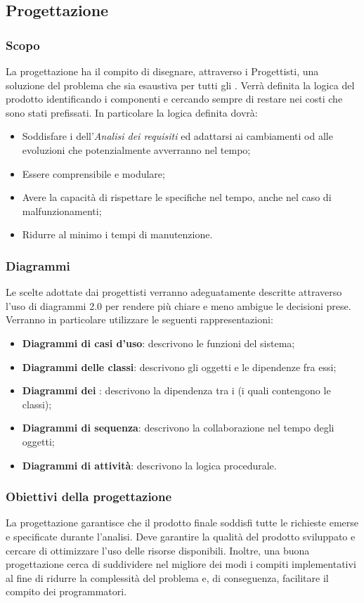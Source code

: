 \subsection{Progettazione}
\subsubsection{Scopo}
La progettazione ha il compito di disegnare, attraverso i Progettisti, una soluzione del problema che sia esaustiva per tutti gli . Verrà definita la logica del prodotto identificando i componenti e cercando sempre di restare nei costi che sono stati prefissati. In particolare la logica definita dovrà:
\begin{itemize}
	\item Soddisfare i  dell’\emph{Analisi dei requisiti} ed adattarsi ai cambiamenti od alle evoluzioni che potenzialmente avverranno nel tempo;
	\item Essere comprensibile e modulare;
	\item Avere la capacità di rispettare le specifiche nel tempo, anche nel caso di malfunzionamenti;
	\item Ridurre al minimo i tempi di manutenzione.
\end{itemize}
\subsubsection{Diagrammi}
Le scelte adottate dai progettisti verranno adeguatamente descritte attraverso l’uso di diagrammi  2.0 per rendere più chiare e meno ambigue le decisioni prese. Verranno in particolare utilizzare le seguenti rappresentazioni:
\begin{itemize}
	\item \textbf{Diagrammi di casi d’uso}: descrivono le funzioni del sistema;
	\item \textbf{Diagrammi delle classi}: descrivono gli oggetti e le dipendenze fra essi;
	\item \textbf{Diagrammi dei }: descrivono la dipendenza tra i  (i quali contengono le classi);
	\item \textbf{Diagrammi di sequenza}: descrivono la collaborazione nel tempo degli oggetti;
	\item \textbf{Diagrammi di attività}: descrivono la logica procedurale.
\end{itemize}
\subsubsection{Obiettivi della progettazione}
La progettazione garantisce che il prodotto finale soddisfi tutte le richieste emerse e specificate durante l’analisi. Deve garantire la qualità del prodotto sviluppato e cercare di ottimizzare l’uso delle risorse disponibili. Inoltre, una buona progettazione cerca di suddividere nel migliore dei modi i compiti implementativi al fine di ridurre la complessità del problema e, di conseguenza, facilitare il compito dei programmatori.
